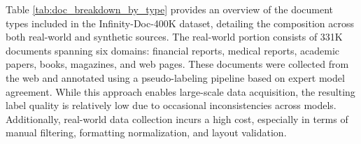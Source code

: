 Table \ref{tab:doc_breakdown_by_type} provides an overview of the document types included in the Infinity-Doc-400K dataset, detailing the composition across both real-world and synthetic sources. The real-world portion consists of 331K documents spanning six domains: financial reports, medical reports, academic papers, books, magazines, and web pages. These documents were collected from the web and annotated using a pseudo-labeling pipeline based on expert model agreement. While this approach enables large-scale data acquisition, the resulting label quality is relatively low due to occasional inconsistencies across models. Additionally, real-world data collection incurs a high cost, especially in terms of manual filtering, formatting normalization, and layout validation.



\begin{table}[h]
  \small
  \centering
  \setlength{\tabcolsep}{14pt} 
  \vspace{3mm}
  \caption{Overview of document types in the Infinity-Doc-400K dataset, including data source, document type, annotation method, and collection cost.}
  \label{tab:doc_breakdown_by_type}
\end{table}







